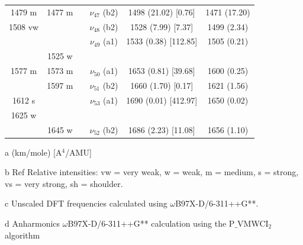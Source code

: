 \begin{table}[H]
\begin{center}
\begin{threeparttable}
\begin{tabular}{c c c c c c}
1479 m & 1477 m &  & $\nu_{47}$ (b2) & 1498 (21.02) [0.76] & 1471 (17.20) \\ 
1508 vw &  &  & $\nu_{48}$ (b2) & 1528 (7.99) [7.37] & 1499 (2.34) \\ 
&  &  & $\nu_{49}$ (a1) & 1533 (0.38) [112.85] & 1505 (0.21) \\ 
& 1525 w &  &  &  &  \\ 
1577 m & 1573 m &  & $\nu_{50}$ (a1) & \multicolumn{1}{c}{1653 (0.81) [39.68]} & 1600 (0.25) \\ 
& 1597 m &  & $\nu_{51}$ (b2) & \multicolumn{1}{c}{1660 (1.70) [0.17]} & 1621 (1.56) \\ 
1612 s &  &  & $\nu_{53}$ (a1) & \multicolumn{1}{c}{1690 (0.01) [412.97]} & 1650 (0.02) \\ 
1625 w &  &  &  & \multicolumn{1}{c}{} &  \\ 
& 1645 w &  & $\nu_{52}$ (b2) & \multicolumn{1}{c}{1686 (2.23) [11.08]} & 1656 (1.10) \\ 
\bottomrule
\end{tabular}

\begin{tablenotes}
	\item[a] (km/mole) [A$^{4}$/AMU]
	\item[b] Ref \cite{michaelian2014raman} Relative intensities: vw = very weak, w = weak, m = medium, s = strong, vs = very strong, sh = shoulder.
	\item[c] Unscaled DFT frequencies calculated using $\omega$B97X-D/6-311++G**.
	\item[d] Anharmonics $\omega$B97X-D/6-311++G** calculation using the P$\_$VMWCI$_{2}$ algorithm
\end{tablenotes}
\end{threeparttable}
\end{center}
\label{freq-Fluorene}
\end{table}


